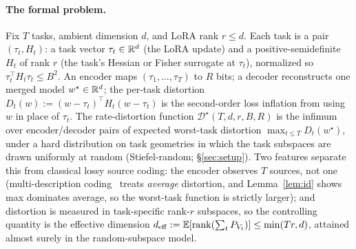 \paragraph{The formal problem.} Fix $T$ tasks, ambient dimension $d$,
and LoRA rank $r \leq d$. Each task is a pair $(\tau_t, H_t)$: a task
vector $\tau_t \in \mathbb{R}^d$ (the LoRA update) and a positive-semidefinite
$H_t$ of rank $r$ (the task's Hessian or Fisher surrogate at
$\tau_t$), normalized so $\tau_t^\top H_t \tau_t \leq B^2$. An encoder
maps $(\tau_1, \ldots, \tau_T)$ to $R$ bits; a decoder reconstructs
one merged model $w^\star \in \mathbb{R}^d$; the per-task distortion
$D_t(w) := (w - \tau_t)^\top H_t (w - \tau_t)$ is the second-order
loss inflation from using $w$ in place of $\tau_t$. The
rate-distortion function $\mathcal{D}^\star(T, d, r, B, R)$ is the
infimum over encoder/decoder pairs of expected worst-task distortion
$\max_{t \leq T} D_t(w^\star)$, under a hard distribution on task
geometries in which the task subspaces are drawn uniformly at random
(Stiefel-random; \S\ref{sec:setup}). Two features separate this from
classical lossy source coding: the encoder observes $T$ sources, not
one (multi-description coding~\cite{elgamalcover1982md} treats
\emph{average} distortion, and Lemma~\ref{lem:id} shows max
dominates average, so the worst-task function is strictly larger);
and distortion is measured in task-specific rank-$r$ subspaces, so
the controlling quantity is the effective dimension
$d_{\mathrm{eff}} := \mathbb{E}[\operatorname{rank}(\sum_t P_{V_t})] \leq \min(Tr, d)$, attained
almost surely in the random-subspace model.

